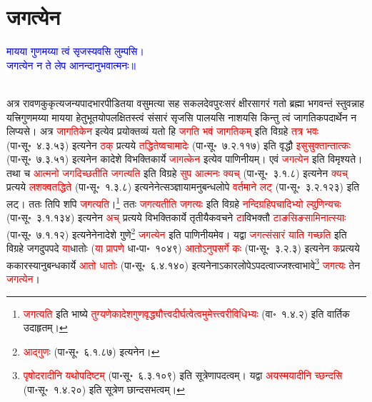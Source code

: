\section[जगत्येन]{जगत्येन}
\centering\textcolor{blue}{मायया गुणमय्या त्वं सृजस्यवसि लुम्पसि।\nopagebreak\\
जगत्येन न ते लेप आनन्दानुभवात्मनः॥}\nopagebreak\\
\\
\begin{sloppypar}\justifying\noindent\hspace{10mm} अत्र रावण\-कुकृत्य\-जन्य\-पाद\-भार\-पीडितया वसुमत्या सह सकल\-देव\-पुरःसरं क्षीर\-सागरं गतो ब्रह्मा भगवन्तं स्तुवन्नाह यत्त्रिगुणमय्या मायया हेतु\-भूतयोपलक्षितस्त्वं संसारं सृजसि पालयसि नाशयसि किन्तु त्वं जागतिक\-पदार्थेन न लिप्यसे। अत्र \textcolor{red}{जागतिकेन} इत्येव प्रयोक्तव्यं यतो हि \textcolor{red}{जगति भवं जागतिकम्} इति विग्रहे \textcolor{red}{तत्र भवः} (पा॰सू॰~४.३.५३) इत्यनेन \textcolor{red}{ठक्} प्रत्यये \textcolor{red}{तद्धितेष्वचामादेः} (पा॰सू॰~७.२.११७) इति वृद्धौ 
\textcolor{red}{इसुसुक्तान्तात्कः} (पा॰सू॰~७.३.५१) इत्यनेन कादेशे विभक्ति\-कार्ये \textcolor{red}{जागत्केन} इत्येव पाणिनीयम्। एवं \textcolor{red}{जगत्येन} इति विमृश्यते। तथा च \textcolor{red}{आत्मनो जगदिच्छतीति जगत्यति} इति विग्रहे \textcolor{red}{सुप आत्मनः क्यच्} (पा॰सू॰~३.१.८) इत्यनेन \textcolor{red}{क्यच्} प्रत्यये \textcolor{red}{लशक्वतद्धिते} (पा॰सू॰~१.३.८) इत्यनेनेत्सञ्ज्ञायामनु\-बन्ध\-लोपे \textcolor{red}{वर्तमाने लट्} (पा॰सू॰~३.२.१२३) इति लट्। ततः तिपि शपि \textcolor{red}{जगत्यति}।\footnote{\textcolor{red}{जगत्यति} इति भाष्ये \textcolor{red}{तुग्यणेकादेश\-गुण\-वृद्ध्यौत्त्व\-दीर्घत्वेत्वमुमेत्त्त्वरी\-विधिभ्यः} (वा॰~१.४.२) इति वार्तिक उदाहृतम्।} ततः \textcolor{red}{जगत्यतीति जगत्यः} इति विग्रहे \textcolor{red}{नन्दिग्रहिपचादिभ्यो ल्युणिन्यचः} (पा॰सू॰~३.१.१३४) इत्यनेन \textcolor{red}{अच्} प्रत्यये विभक्ति\-कार्ये तृतीयैक\-वचने \textcolor{red}{टा}\-विभक्तौ \textcolor{red}{टाङसिङसामिनात्स्याः} (पा॰सू॰~७.१.१२) इत्यनेनेनादेशे गुणे\footnote{\textcolor{red}{आद्गुणः} (पा॰सू॰~६.१.८७) इत्यनेन।} \textcolor{red}{जगत्येन} इति पाणिनीयमेव। यद्वा \textcolor{red}{जगत्संसारं याति गच्छति} इति विग्रहे जगदुपपदे \textcolor{red}{या}\-धातोः (\textcolor{red}{या प्रापणे} धा॰पा॰~१०४९) \textcolor{red}{आतोऽनुपसर्गे कः} (पा॰सू॰~३.२.३) इत्यनेन \textcolor{red}{क}\-प्रत्यये ककारस्यानुबन्ध\-कार्ये \textcolor{red}{आतो धातोः} (पा॰सू॰~६.४.१४०) इत्यनेनाऽकार\-लोपेऽपदत्वाज्जश्त्वाभावे\footnote{\textcolor{red}{पृषोदरादीनि यथोपदिष्टम्} (पा॰सू॰~६.३.१०९) इति सूत्रेणापदत्वम्। यद्वा \textcolor{red}{अयस्मयादीनि च्छन्दसि} (पा॰सू॰~१.४.२०) इति सूत्रेण छान्दसभत्वम्।} \textcolor{red}{जगत्यः} तेन \textcolor{red}{जगत्येन}।

\end{sloppypar}
